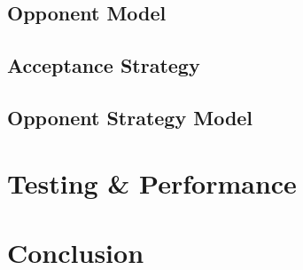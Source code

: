 \documentclass[a4paper,10pt]{article}
\begin{document}
\subsection{Opponent Model}
\label{sec:strategyOM}


\subsection{Acceptance Strategy}
\label{sec:strategyAS}


\subsection{Opponent Strategy Model}
\label{sec:strategyOMS}


\section{Testing \& Performance}
\label{sec:performance}



\section{Conclusion}
\label{sec:conclusion}




\end{document}
